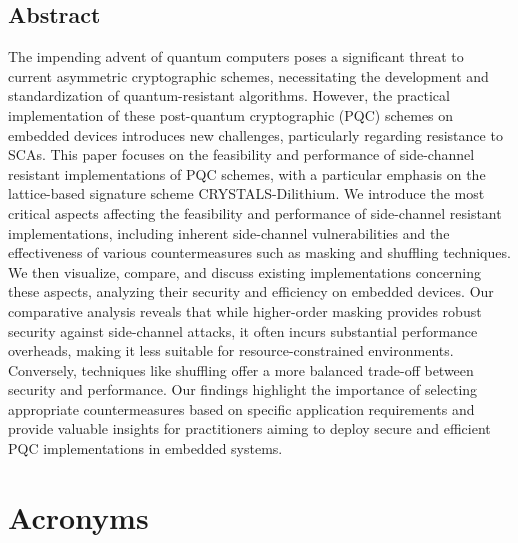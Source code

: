 \documentclass[a4paper,12pt,oneside,openany,headsepline,bibliography=totocnumbered]{scrbook}
\begin{document}


\section*{Abstract}
\thispagestyle{abstract}

The impending advent of quantum computers poses a significant threat to current asymmetric cryptographic schemes, necessitating the development and standardization of quantum-resistant algorithms. However, the practical implementation of these post-quantum cryptographic (PQC) schemes on embedded devices introduces new challenges, particularly regarding resistance to \acp{SCA}. This paper focuses on the feasibility and performance of side-channel resistant implementations of PQC schemes, with a particular emphasis on the lattice-based signature scheme CRYSTALS-Dilithium. We introduce the most critical aspects affecting the feasibility and performance of side-channel resistant implementations, including inherent side-channel vulnerabilities and the effectiveness of various countermeasures such as masking and shuffling techniques. We then visualize, compare, and discuss existing implementations concerning these aspects, analyzing their security and efficiency on embedded devices. Our comparative analysis reveals that while higher-order masking provides robust security against side-channel attacks, it often incurs substantial performance overheads, making it less suitable for resource-constrained environments. Conversely, techniques like shuffling offer a more balanced trade-off between security and performance. Our findings highlight the importance of selecting appropriate countermeasures based on specific application requirements and provide valuable insights for practitioners aiming to deploy secure and efficient PQC implementations in embedded systems.



\tableofcontents
\thispagestyle{contents}

\chapter*{Acronyms}
\thispagestyle{acronyms}
\begin{acronym}[PQC]
\end{acronym}







\newpage
\noindent\parbox{\textwidth}{
    \listoftables
    \vspace{1cm} %
    \listoffigures
}


\newpage


\thispagestyle{bibliography}
\end{document}
